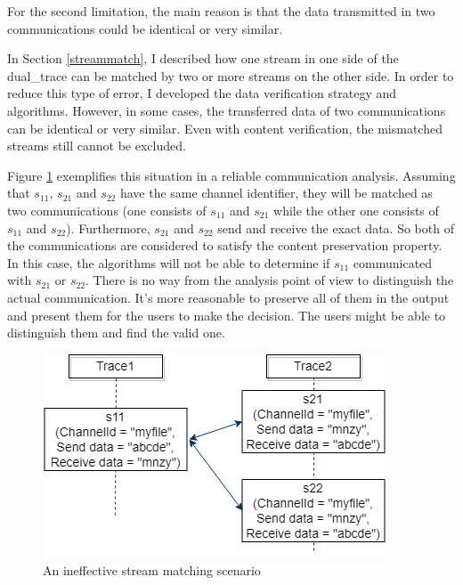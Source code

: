 For the second limitation, the main reason is that the data transmitted in two communications could be identical or very similar. 

In Section \ref{streammatch}, I described how one stream in one side of the dual\_trace can be matched by two or more streams on the other side. In order to reduce this type of error, I developed the data verification strategy and algorithms. However, in some cases, the transferred data of two communications can be identical or very similar. Even with content verification, the mismatched streams still cannot be excluded.

Figure \ref{secondlevelmatching} exemplifies this situation in a reliable communication analysis. Assuming that $s_{11}$, $s_{21}$ and $s_{22}$ have the same channel identifier, they will be matched as two communications (one consists of $s_{11}$ and $s_{21}$ while the other one consists of $s_{11}$ and $s_{22}$). Furthermore, $s_{21}$ and $s_{22}$ send and receive the exact data. So both of the communications are considered to satisfy the content preservation property. In this case, the algorithms will not be able to determine if  $s_{11}$ communicated with $s_{21}$ or $s_{22}$. There is no way from the analysis point of view to distinguish the actual communication. It's more reasonable to preserve all of them in the output and present them for the users to make the decision. The users might be able to distinguish them and find the valid one.


\begin{figure}[H]
\centerline{\includegraphics{Figures/secondlevelmatching}}
 \caption{An ineffective stream matching scenario}
\label{secondlevelmatching}
\end{figure}



